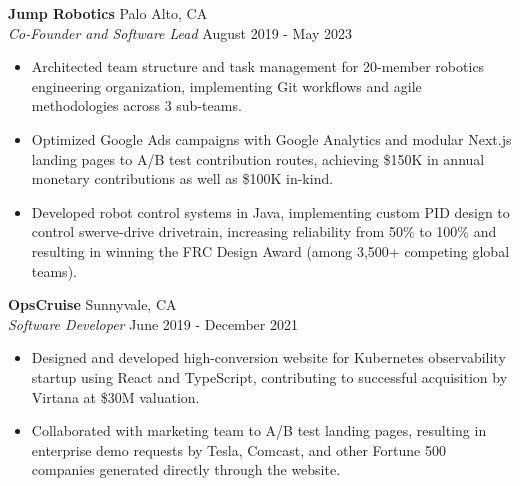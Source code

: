 \documentclass[11pt,a4paper]{article}
\begin{document}
\noindent\textbf{Jump Robotics} \hfill Palo Alto, CA\\
\textit{Co-Founder and Software Lead} \hfill August 2019 - May 2023
\begin{itemize}[itemsep=0pt]
\item Architected team structure and task management for 20-member robotics engineering organization, implementing Git workflows and agile methodologies across 3 sub-teams.
\item Optimized Google Ads campaigns with Google Analytics and modular Next.js landing pages to A/B test contribution routes, achieving \$150K in annual monetary contributions as well as \$100K in-kind.
\item Developed robot control systems in Java, implementing custom PID design to control swerve-drive drivetrain, increasing reliability from 50\% to 100\% and resulting in winning the FRC Design Award (among 3,500+ competing global teams).
\end{itemize}

\noindent\textbf{OpsCruise} \hfill Sunnyvale, CA\\
\textit{Software Developer} \hfill June 2019 - December 2021
\begin{itemize}[itemsep=0pt]
\item Designed and developed high-conversion website for Kubernetes observability startup using React and TypeScript, contributing to successful acquisition by Virtana at \$30M valuation.
\item Collaborated with marketing team to A/B test landing pages, resulting in enterprise demo requests by Tesla, Comcast, and other Fortune 500 companies generated directly through the website.
\end{itemize}
\end{document}
